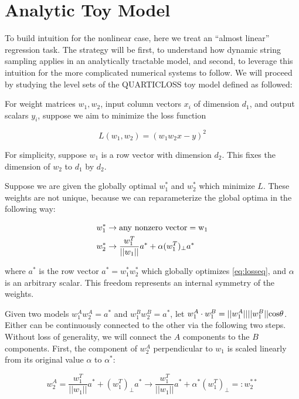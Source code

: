 \documentclass[twocolumn,superscriptaddress,aps,prb,floatfix]{revtex4-1}
\begin{document}
\section{Analytic Toy Model}
\label{sec:ToyModel}

 To build intuition for the nonlinear case, here we treat an ``almost linear'' regression task.  The strategy will be first, to understand how dynamic string sampling applies in an analytically tractable model, and second, to leverage this intuition for the more complicated numerical systems to follow.  We will proceed by studying the level sets of the \rm{QUARTICLOSS} toy model defined as followed:
 
 For weight matrices $w_1, w_2$, input column vectors $x_i$ of dimension $d_1$, and output scalars $y_i$, suppose we aim to minimize the loss function
 
  \begin{equation}
 L(w_1,w_2)=(w_1 w_2 x - y)^2 \label{eq:losseq}
  \end{equation}
 
 For simplicity, suppose $w_1$ is a row vector with dimension $d_2$.  This fixes the dimension of $w_2$ to $d_1$ by $d_2$.
 
 Suppose we are given the globally optimal $w_1^*$ and $w_2^*$ which minimize $L$.  These weights are not unique, because we can reparameterize the global optima in the following way:
 
  \begin{align}
 w_1^* &\rightarrow \rm{any\ nonzero\ vector} = w_1 \\
 w_2^* &\rightarrow \frac{w_1^T}{||w_1||} a^* + \alpha (w_1^T)_\perp a^*
  \end{align}
  
  where $a^*$ is the row vector $a^*=w_1^* w_2^*$ which globally optimizes \eqref{eq:losseq}, and $\alpha$ is an arbitrary scalar.  This freedom represents an internal symmetry of the weights.
  
  Given two models $w_1^A w_2^A = a^*$ and $w_1^B w_2^B = a^*$, let $w_1^A \cdot w_1^B=||w_1^A||||w_1^B||\rm{cos}\theta$.  Either can be continuously connected to the other via the following two steps.  Without loss of generality, we will connect the $A$ components to the $B$ components.  First, the component of $w_2^A$ perpendicular to $w_1$ is scaled linearly from its original value $\alpha$ to $\alpha^*$:
  
 \begin{equation}
 w_2^A = \frac{w_1^T}{||w_1||} a^* + (w_1^T)_\perp a^* \rightarrow \frac{w_1^T}{||w_1||} a^* + \alpha^* (w_1^T)_\perp =: w_2^{**}
  \end{equation}
  
\end{document}
